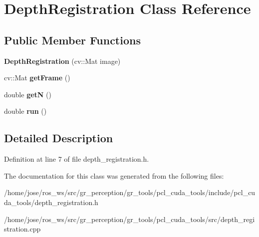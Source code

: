 \hypertarget{classDepthRegistration}{}\section{Depth\+Registration Class Reference}
\label{classDepthRegistration}
\subsection*{Public Member Functions}
\begin{DoxyCompactItemize}
\item 
\mbox{\label{classDepthRegistration_a204a11f834d8c753289b6947e9c58bca}} 
{\bfseries Depth\+Registration} (cv\+::\+Mat image)
\item 
\mbox{\label{classDepthRegistration_a84ba46a53e596e217b29c74746dccdf0}} 
cv\+::\+Mat {\bfseries get\+Frame} ()
\item 
\mbox{\label{classDepthRegistration_ac78d397c731474bb20b3994840cbc4a4}} 
double {\bfseries getN} ()
\item 
\mbox{\label{classDepthRegistration_ad58a2e94ce87591bfd7e22a1fea1017e}} 
double {\bfseries run} ()
\end{DoxyCompactItemize}


\subsection{Detailed Description}


Definition at line 7 of file depth\+\_\+registration.\+h.



The documentation for this class was generated from the following files\+:\begin{DoxyCompactItemize}
\item 
/home/jose/ros\+\_\+ws/src/gr\+\_\+perception/gr\+\_\+tools/pcl\+\_\+cuda\+\_\+tools/include/pcl\+\_\+cuda\+\_\+tools/depth\+\_\+registration.\+h\item 
/home/jose/ros\+\_\+ws/src/gr\+\_\+perception/gr\+\_\+tools/pcl\+\_\+cuda\+\_\+tools/src/depth\+\_\+registration.\+cpp\end{DoxyCompactItemize}
